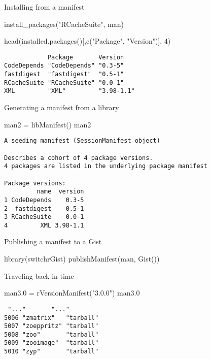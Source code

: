 \documentclass[presentation]{beamer}
\begin{document}
\begin{frame}[fragile,label=sec-6-4]{Installing from a manifest}
 \begin{Code}
install_packages("RCacheSuite", man)
\end{Code}
\begin{Code}
head(installed.packages()[,c("Package", "Version")], 4)
\end{Code}

\begin{verbatim}
            Package       Version   
CodeDepends "CodeDepends" "0.3-5"   
fastdigest  "fastdigest"  "0.5-1"   
RCacheSuite "RCacheSuite" "0.0-1"   
XML         "XML"         "3.98-1.1"
\end{verbatim}
\end{frame}

\begin{frame}[fragile,label=sec-6-5]{Generating a manifest from a library}
 \begin{Code}
man2 = libManifest()
man2
\end{Code}

\begin{verbatim}
A seeding manifest (SessionManifest object)

Describes a cohort of 4 package versions. 
4 packages are listed in the underlying package manifest

Package versions:
         name  version
1 CodeDepends    0.3-5
2  fastdigest    0.5-1
3 RCacheSuite    0.0-1
4         XML 3.98-1.1
\end{verbatim}
\end{frame}

\begin{frame}[fragile,label=sec-6-6]{Publishing a manifest to a Gist}
 \begin{Code}
library(switchrGist)
publishManifest(man, Gist())
\end{Code}
\end{frame}

\begin{frame}[fragile,label=sec-6-7]{Traveling back in time}
 \begin{Code}
man3.0 = rVersionManifest("3.0.0")
man3.0
\end{Code}

\begin{verbatim}
 "..."       "..."    
5006 "zmatrix"   "tarball"
5007 "zoeppritz" "tarball"
5008 "zoo"       "tarball"
5009 "zooimage"  "tarball"
5010 "zyp"       "tarball"
\end{verbatim}
\end{frame}
\end{document}

